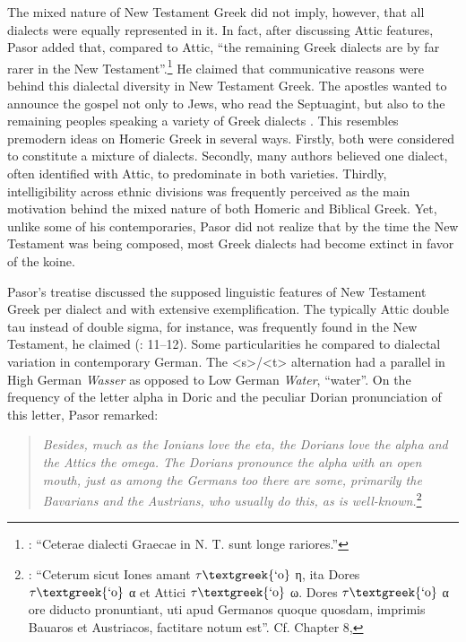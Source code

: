 The mixed nature of New Testament Greek did not imply, however, that all dialects were equally represented in it. In fact, after discussing Attic features, Pasor added that, compared to Attic, “the remaining Greek dialects are by far rarer in the New Testament”.\footnote{\citet[24]{Pasor1632}: “Ceterae dialecti Graecae in N. T. sunt longe rariores.”} He claimed that communicative reasons were behind this dialectal diversity in New Testament Greek. The apostles wanted to announce the gospel not only to Jews, who read the Septuagint, but also to the remaining peoples speaking a variety of Greek dialects \citep[143]{Pasor1650}. This resembles premodern ideas on Homeric Greek in several ways. Firstly, both were considered to constitute a mixture of dialects. Secondly, many authors believed one dialect, often identified with Attic, to predominate in both varieties. Thirdly, intelligibility across ethnic divisions was frequently perceived as the main motivation behind the mixed nature of both Homeric and Biblical Greek. Yet, unlike some of his contemporaries, Pasor did not realize that by the time the New Testament was being composed, most Greek dialects had become extinct in favor of the koine.

Pasor’s treatise discussed the supposed linguistic features of New Testament Greek per dialect and with extensive exemplification. The typically Attic double tau instead of double sigma, for instance, was frequently found in the New Testament, he claimed (\citealt{Pasor1632}: 11–12). Some particularities he compared to dialectal variation in contemporary German. The <s>/<t> alternation had a parallel in High German \textit{Wasser} as opposed to Low German \textit{Water}, “water”. On the frequency of the letter alpha in Doric and the peculiar Dorian pronunciation of this letter, Pasor remarked:

\begin{quote}
\emph{\textup{Besides,} \emph{much} \emph{as} \emph{the} \emph{Ionians} \emph{love} \emph{the} \emph{eta,} \emph{the} \emph{Dorians} \emph{love} \emph{the} \emph{alpha} \emph{and} \emph{the} \emph{Attics} \emph{the} \emph{omega.} \emph{The} \emph{Dorians} \emph{pronounce} \emph{the} \emph{alpha} \emph{with} \emph{an} \emph{open} \emph{mouth,} \emph{just} \emph{as} \emph{among} \emph{the} \emph{Germans} \emph{too} \emph{there} \emph{are} \emph{some,} \emph{primarily} \emph{the} \emph{Bavarians} \emph{and} \emph{the} \emph{Austrians,} \emph{who} \emph{usually} \emph{do} \emph{this,} \emph{as} \emph{is} \emph{well-known.}}\footnote{\citet[28]{Pasor1632}: “Ceterum sicut Iones amant $\tau \text{\textgreek{`o}}$ η, ita Dores $\tau \text{\textgreek{`o}}$ α et Attici $\tau \text{\textgreek{`o}}$ ω. Dores $\tau \text{\textgreek{`o}}$ α ore diducto pronuntiant, uti apud Germanos quoque quosdam, imprimis Bauaros et Austriacos, factitare notum est”. Cf. Chapter 8, }
\end{quote}

